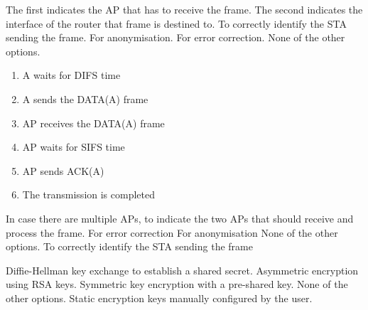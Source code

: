 \begin{checkboxes}
    \CorrectChoice The first indicates the AP that has to receive the frame. The second indicates the interface of the router that frame is destined to.
    \choice To correctly identify the STA sending the frame.
    \choice For anonymisation.
    \choice For error correction.
    \choice None of the other options.
\end{checkboxes}

\begin{solution}
    \begin{enumerate}
        \item A waits for DIFS time
        \item A sends the DATA(A) frame
        \item AP receives the DATA(A) frame
        \item AP waits for SIFS time
        \item AP sends ACK(A)
        \item The transmission is completed
    \end{enumerate}
\end{solution}

\begin{checkboxes}
    \choice In case there are multiple APs, to indicate the two APs that should receive and process the frame.
    \choice For error correction
    \choice For anonymisation
    \CorrectChoice None of the other options.
    \choice To correctly identify the STA sending the frame
\end{checkboxes}

\begin{checkboxes}
    \CorrectChoice Diffie-Hellman key exchange to establish a shared secret.
    \choice Asymmetric encryption using RSA keys.
    \choice Symmetric key encryption with a pre-shared key.
    \choice None of the other options.
    \choice Static encryption keys manually configured by the user.
\end{checkboxes}

